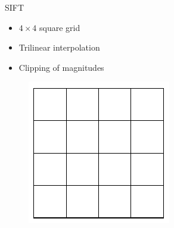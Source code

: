 \documentclass[14pt,t]{beamer}
\begin{document}
\begin{frame}{SIFT \cite{lowe2004distinctive}}
\ghostframe
\begin{minipage}[t]{0.7\textwidth}
	\begin{itemize}
	\item $4 \times 4$ square grid
	\item Trilinear interpolation
	\item Clipping of magnitudes
	\end{itemize}
\end{minipage}
\begin{minipage}[t]{0.25\textwidth}
	\begin{figure}
		\includegraphics[width=\textwidth]{../report/img/siftGrid.pdf}
	\end{figure}
\end{minipage}
\end{frame}
%
\end{document}
